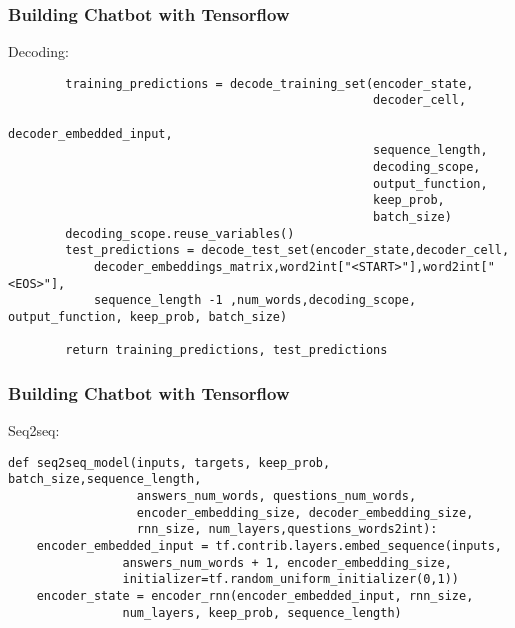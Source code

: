 \begin{frame}[fragile]\frametitle{Building Chatbot with Tensorflow}
Decoding:
\begin{lstlisting}
        training_predictions = decode_training_set(encoder_state,
                                                   decoder_cell,
                                                   decoder_embedded_input,
                                                   sequence_length,
                                                   decoding_scope,
                                                   output_function,
                                                   keep_prob,
                                                   batch_size)
        decoding_scope.reuse_variables()
        test_predictions = decode_test_set(encoder_state,decoder_cell,
            decoder_embeddings_matrix,word2int["<START>"],word2int["<EOS>"],
            sequence_length -1 ,num_words,decoding_scope, output_function, keep_prob, batch_size)
        
        return training_predictions, test_predictions                                                  
\end{lstlisting}

\end{frame}

\begin{frame}[fragile]\frametitle{Building Chatbot with Tensorflow}
Seq2seq:
\begin{lstlisting}
def seq2seq_model(inputs, targets, keep_prob, batch_size,sequence_length,
                  answers_num_words, questions_num_words, 
                  encoder_embedding_size, decoder_embedding_size,
                  rnn_size, num_layers,questions_words2int):
    encoder_embedded_input = tf.contrib.layers.embed_sequence(inputs,
                answers_num_words + 1, encoder_embedding_size,
                initializer=tf.random_uniform_initializer(0,1))
    encoder_state = encoder_rnn(encoder_embedded_input, rnn_size,
                num_layers, keep_prob, sequence_length)             
\end{lstlisting}

\end{frame}

